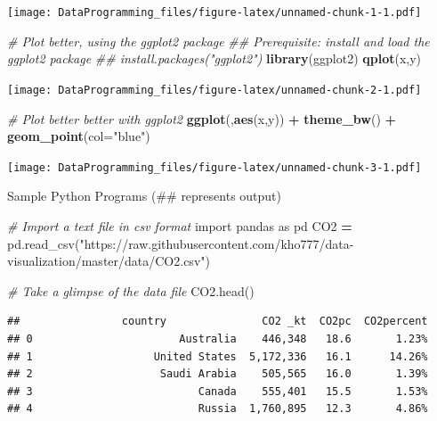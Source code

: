 \documentclass[]{book}
\newenvironment{Shaded}{\begin{snugshade}}{\end{snugshade}}
\newcommand{\CommentTok}[1]{\textcolor[rgb]{0.56,0.35,0.01}{\textit{#1}}}
\newcommand{\DataTypeTok}[1]{\textcolor[rgb]{0.13,0.29,0.53}{#1}}
\newcommand{\ImportTok}[1]{#1}
\newcommand{\KeywordTok}[1]{\textcolor[rgb]{0.13,0.29,0.53}{\textbf{#1}}}
\newcommand{\NormalTok}[1]{#1}
\newcommand{\OperatorTok}[1]{\textcolor[rgb]{0.81,0.36,0.00}{\textbf{#1}}}
\newcommand{\StringTok}[1]{\textcolor[rgb]{0.31,0.60,0.02}{#1}}
\begin{document}
\texttt{[image: DataProgramming\_files/figure-latex/unnamed-chunk-1-1.pdf]}

\begin{Shaded}
\begin{Highlighting}[]
\CommentTok{# Plot better, using the ggplot2 package }
\CommentTok{## Prerequisite: install and load the ggplot2 package}
\CommentTok{## install.packages("ggplot2")}
\KeywordTok{library}\NormalTok{(ggplot2)}
\KeywordTok{qplot}\NormalTok{(x,y)}
\end{Highlighting}
\end{Shaded}

\texttt{[image: DataProgramming\_files/figure-latex/unnamed-chunk-2-1.pdf]}

\begin{Shaded}
\begin{Highlighting}[]
\CommentTok{# Plot better better with ggplot2}
\KeywordTok{ggplot}\NormalTok{(,}\KeywordTok{aes}\NormalTok{(x,y)) }\OperatorTok{+}\StringTok{ }\KeywordTok{theme_bw}\NormalTok{() }\OperatorTok{+}\StringTok{ }\KeywordTok{geom_point}\NormalTok{(}\DataTypeTok{col=}\StringTok{"blue"}\NormalTok{)}
\end{Highlighting}
\end{Shaded}

\texttt{[image: DataProgramming\_files/figure-latex/unnamed-chunk-3-1.pdf]}

Sample Python Programs (\#\# represents output)

\begin{Shaded}
\begin{Highlighting}[]

\CommentTok{# Import a text file in csv format}
\ImportTok{import}\NormalTok{ pandas }\ImportTok{as}\NormalTok{ pd}
\NormalTok{CO2 }\OperatorTok{=}\NormalTok{ pd.read_csv(}\StringTok{"https://raw.githubusercontent.com/kho777/data-visualization/master/data/CO2.csv"}\NormalTok{)}

\CommentTok{# Take a glimpse of the data file}
\NormalTok{CO2.head()}
\end{Highlighting}
\end{Shaded}

\begin{verbatim}
##                country               CO2 _kt  CO2pc  CO2percent
## 0                       Australia    446,348   18.6       1.23%
## 1                   United States  5,172,336   16.1      14.26%
## 2                    Saudi Arabia    505,565   16.0       1.39%
## 3                          Canada    555,401   15.5       1.53%
## 4                          Russia  1,760,895   12.3       4.86%
\end{verbatim}
\end{document}

